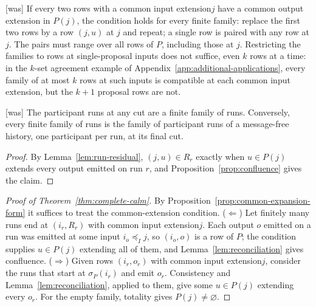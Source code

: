 \documentclass[sigconf]{cidr-2027}
\theoremstyle{remark}
\newcommand{\InputOrd}{\preceq_I}
\newcommand{\indesc}{input extension\xspace} %
\newcommand{\outrel}{extends\xspace}          %
\newcommand{\outrelpart}{extending\xspace}    %
\newcommand{\outnoun}{output extension\xspace}%
\newcommand{\fiber}[1]{P(#1)}
\begin{document}
{\footnotesize\color{black!50}\noindent\textsf{[was]} If every two rows with a common \indesc $j$ have a common \outnoun in
$\fiber{j}$, the condition holds for every finite family: replace the first
two rows by a row $(j,u)$ at $j$ and repeat; a single row is paired with any
row at $j$.  The pairs must range over all rows of $P$, including those at
$j$.  Restricting the families to rows at single-proposal inputs does not
suffice, even $k$ rows at a time: in the $k$-set agreement example of
Appendix~\ref{app:additional-applications}, every family of at most $k$ rows
at such inputs is compatible at each common \indesc, but the $k+1$ proposal
rows are not.\par}



{\footnotesize\color{black!50}\noindent\textsf{[was]} The participant runs at any cut are a finite family of runs.  Conversely,
every finite family of runs is the family of participant runs of a
message-free history, one participant per run, at its final cut.\par}

\color{blue!70!black}\begin{proof}
By Lemma~\ref{lem:run-residual}, $(j,u)\in R_r$ exactly when $u\in\fiber{j}$
\outrel every output emitted on run $r$, and Proposition~\ref{prop:confluence}
gives the claim.\color{black}
\end{proof}

\color{blue!70!black}\begin{proof}[Proof of Theorem~\ref{thm:complete-calm}]
By Proposition~\ref{prop:common-expansion-form} it suffices to treat the
common-extension condition.  ($\Leftarrow$) Let finitely many runs end at
$(i_r,R_r)$ with common \indesc $j$.  Each output $o$ emitted on a run was
emitted at some input $i_o\InputOrd j$, so $(i_o,o)$ is a row of $P$; the
condition supplies $u\in\fiber{j}$ \outrelpart all of them, and
Lemma~\ref{lem:reconciliation} gives confluence.  ($\Rightarrow$) Given rows $(i_r,o_r)$ with common \indesc $j$, consider
the runs that start at $\sigma_P(i_r)$ and emit $o_r$.  Consistency and
Lemma~\ref{lem:reconciliation}, applied to them, give some $u\in\fiber{j}$
\outrelpart every $o_r$.  For the empty family, totality gives
$\fiber{j}\neq\varnothing$.\color{black}
\end{proof}
\end{document}

